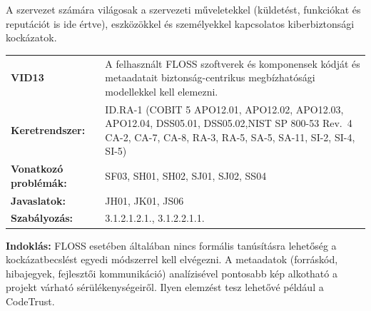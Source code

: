 \documentclass[12pt,magyar,a4paper,oneside]{scrreprt}
\begin{document}
A szervezet számára világosak a szervezeti műveletekkel (küldetést,
funkciókat és reputációt is ide értve), eszközökkel és személyekkel
kapcsolatos kiberbiztonsági kockázatok.

\begin{longtable}[]{@{}ll@{}}
\toprule
\endhead
\begin{minipage}[t]{0.16\columnwidth}\raggedright
\textbf{VID13}\strut
\end{minipage} & \begin{minipage}[t]{0.79\columnwidth}\raggedright
A felhasznált FLOSS szoftverek és komponensek kódját és metaadatait
biztonság-centrikus megbízhatósági modellekkel kell elemezni.\strut
\end{minipage}\tabularnewline
\begin{minipage}[t]{0.16\columnwidth}\raggedright
\textbf{Keretrendszer:}\strut
\end{minipage} & \begin{minipage}[t]{0.79\columnwidth}\raggedright
ID.RA-1 (COBIT 5 APO12.01, APO12.02, APO12.03, APO12.04, DSS05.01,
DSS05.02,NIST SP 800-53 Rev.~4 CA-2, CA-7, CA-8, RA-3, RA-5, SA-5,
SA-11, SI-2, SI-4, SI-5)\strut
\end{minipage}\tabularnewline
\begin{minipage}[t]{0.16\columnwidth}\raggedright
\textbf{Vonatkozó problémák:}\strut
\end{minipage} & \begin{minipage}[t]{0.79\columnwidth}\raggedright
SF03, SH01, SH02, SJ01, SJ02, SS04\strut
\end{minipage}\tabularnewline
\begin{minipage}[t]{0.16\columnwidth}\raggedright
\textbf{Javaslatok:}\strut
\end{minipage} & \begin{minipage}[t]{0.79\columnwidth}\raggedright
JH01, JK01, JS06\strut
\end{minipage}\tabularnewline
\begin{minipage}[t]{0.16\columnwidth}\raggedright
\textbf{Szabályozás:}\strut
\end{minipage} & \begin{minipage}[t]{0.79\columnwidth}\raggedright
3.1.2.1.2.1., 3.1.2.2.1.1.\strut
\end{minipage}\tabularnewline
\bottomrule
\end{longtable}

\textbf{Indoklás: } FLOSS esetében általában nincs formális tanúsításra
lehetőség a kockázatbecslést egyedi módszerrel kell elvégezni. A
metaadatok (forráskód, hibajegyek, fejlesztői kommunikáció) analízisével
pontosabb kép alkotható a projekt várható sérülékenységeiről. Ilyen
elemzést tesz lehetővé például a CodeTrust.
\end{document}
